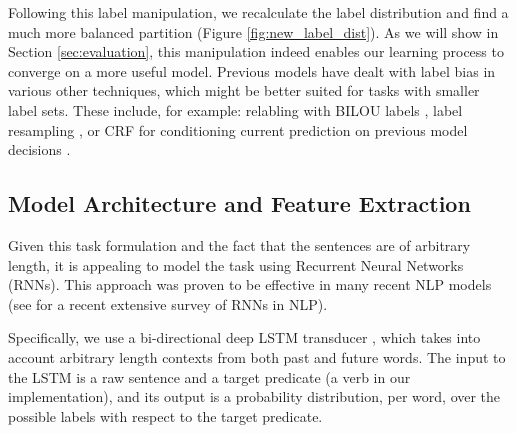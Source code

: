 
\begin{figure}[H]
\end{figure}


Following this label manipulation, we recalculate the label distribution and find
a much more balanced partition (Figure \ref{fig:new_label_dist}).
As we will show in Section \ref{sec:evaluation}, this manipulation indeed enables our learning process to
converge on a more useful model.
Previous models have dealt with label bias in various other techniques, which might be better suited
for tasks with smaller label sets. These include, for example:
relabling with BILOU labels \cite{ratinov2009design},
label resampling \cite{estabrooks2004multiple},
or CRF for conditioning current prediction on previous model decisions \cite{baidusrl}.

\subsection{Model Architecture and Feature Extraction}
Given this task formulation and the fact that the sentences are of arbitrary length,
it is appealing to model the task using Recurrent Neural Networks (RNNs).
This approach was proven to be effective in many recent NLP models 
(see \cite{goldberg2015primer} for a recent extensive survey of RNNs in NLP).

Specifically, we use a bi-directional deep LSTM transducer \cite{graves2012sequence},
which takes into account arbitrary length contexts from both past and future words.
The input to the LSTM is a raw sentence and a target predicate (a verb in our implementation),
and its output is a probability distribution, per word, over the possible labels with respect to the target predicate.


